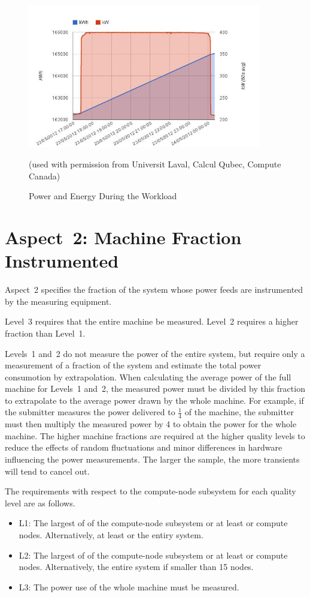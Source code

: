 \begin{figure}
\centering
\includegraphics[width=4in]{fig3-6}
\caption{Power and Energy During the Workload}
(used with permission from Universit Laval, Calcul Qubec, Compute Canada)
\label{fig:powengwl}
\end{figure}

\section{Aspect~2: Machine Fraction Instrumented}
\label{sec:A2MFI}
\noindent
Aspect~2 specifies the fraction of the system whose power feeds are instrumented by the measuring equipment.
\wl

\noindent
Level~3 requires that the entire machine be measured.
Level~2 requires a higher fraction than Level~1.
\wl

\noindent
Levels~1 and~2 do not measure the power of the entire system, but require only a measurement of a fraction of the system and estimate the total power consumotion by extrapolation.
When calculating the average power of the full machine for Levels~1 and~2, the measured power must be divided by this fraction to 
extrapolate to the average power drawn by the whole machine.
For example, if the submitter measures the power delivered 
to $ \frac{1}{4} $ of the machine, the submitter must then multiply the measured power by 4 to obtain the power for the whole machine.
The higher machine fractions are required at the higher quality levels to reduce the effects of random fluctuations and minor differences in hardware influencing the power measurements.
The larger the sample, the more transients will tend to cancel out.
\wl

\noindent
The requirements with respect to the compute-node subsystem for each quality level are as follows.

\begin{itemize}
\item
L1: The largest of \SpecFracMinLOne{} of the compute-node subsystem or at least \SpecPowerMinLOne{} or \SpecMinNodes{} compute nodes.
Alternatively, at least \SpecPowerMaxLOne{} or the entiry system.
\item
L2: The largest of \SpecFracMinLTwo{} of the compute-node subsystem or at least \SpecPowerMinLTwo{} or \SpecMinNodes{} compute nodes.
Alternatively, the entire system if smaller than 15 nodes.
\item
L3: The power use of the whole machine must be measured.
\end{itemize}

